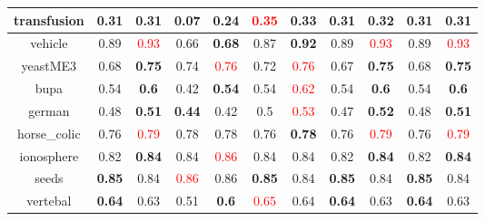 \documentclass{article}%
\begin{document}
\begin{tabular}{c|cccccccccc}
\hline%
transfusion&0.31&0.31&0.07&\textbf{0.24}&\textcolor{red}{ 
0.35
}&0.33&0.31&\textbf{0.32}&0.31&0.31\\%
\hline%
vehicle&0.89&\textcolor{red}{ 
0.93
}&0.66&\textbf{0.68}&0.87&\textbf{0.92}&0.89&\textcolor{red}{ 
0.93
}&0.89&\textcolor{red}{ 
0.93
}\\%
\hline%
yeastME3&0.68&\textbf{0.75}&0.74&\textcolor{red}{ 
0.76
}&0.72&\textcolor{red}{ 
0.76
}&0.67&\textbf{0.75}&0.68&\textbf{0.75}\\%
\hline%
bupa&0.54&\textbf{0.6}&0.42&\textbf{0.54}&0.54&\textcolor{red}{ 
0.62
}&0.54&\textbf{0.6}&0.54&\textbf{0.6}\\%
\hline%
german&0.48&\textbf{0.51}&\textbf{0.44}&0.42&0.5&\textcolor{red}{ 
0.53
}&0.47&\textbf{0.52}&0.48&\textbf{0.51}\\%
\hline%
horse\_colic&0.76&\textcolor{red}{ 
0.79
}&0.78&0.78&0.76&\textbf{0.78}&0.76&\textcolor{red}{ 
0.79
}&0.76&\textcolor{red}{ 
0.79
}\\%
\hline%
ionosphere&0.82&\textbf{0.84}&0.84&\textcolor{red}{ 
0.86
}&0.84&0.84&0.82&\textbf{0.84}&0.82&\textbf{0.84}\\%
\hline%
seeds&\textbf{0.85}&0.84&\textcolor{red}{ 
0.86
}&0.86&\textbf{0.85}&0.84&\textbf{0.85}&0.84&\textbf{0.85}&0.84\\%
\hline%
vertebal&\textbf{0.64}&0.63&0.51&\textbf{0.6}&\textcolor{red}{ 
0.65
}&0.64&\textbf{0.64}&0.63&\textbf{0.64}&0.63\\%
\hline%
\end{tabular}

%
\end{document}
